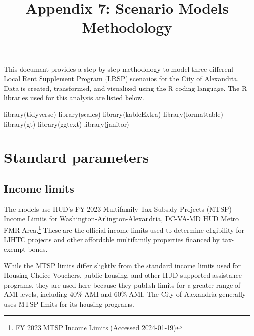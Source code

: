 \documentclass[
  10pt,
  letterpaper,
  DIV=11,
  numbers=noendperiod]{scrartcl}
\title{Appendix 7: Scenario Models Methodology}
\author{}
\date{}
\newenvironment{Shaded}{\begin{snugshade}}{\end{snugshade}}
\newcommand{\FunctionTok}[1]{\textcolor[rgb]{0.28,0.35,0.67}{#1}}
\newcommand{\NormalTok}[1]{\textcolor[rgb]{0.00,0.23,0.31}{#1}}
\begin{document}
\maketitle

\vspace{-1.5cm}

This document provides a step-by-step methodology to model three
different Local Rent Supplement Program (LRSP) scenarios for the City of
Alexandria. Data is created, transformed, and visualized using the R
coding language. The R libraries used for this analysis are listed
below.

\begin{Shaded}
\begin{Highlighting}[]
\FunctionTok{library}\NormalTok{(tidyverse)}
\FunctionTok{library}\NormalTok{(scales)}
\FunctionTok{library}\NormalTok{(kableExtra)}
\FunctionTok{library}\NormalTok{(formattable)}
\FunctionTok{library}\NormalTok{(gt)}
\FunctionTok{library}\NormalTok{(ggtext)}
\FunctionTok{library}\NormalTok{(janitor)}
\end{Highlighting}
\end{Shaded}

\section{Standard parameters}\label{standard-parameters}

\subsection{Income limits}\label{income-limits}

The models use HUD's FY 2023 Multifamily Tax Subsidy Projects (MTSP)
Income Limits for Washington-Arlington-Alexandria, DC-VA-MD HUD Metro
FMR Area.\footnote{\href{https://www.huduser.gov/portal/datasets/il/il2023/2023sum_mtsp.odn?inputname=METRO47900M47900*Washington-Arlington-Alexandria\%2C+DC-VA-MD+HUD+Metro+FMR+Area&area_choice=hmfa&year=2023\#top}{FY
  2023 MTSP Income Limits} (Accessed 2024-01-19)} These are the official
income limits used to determine eligibility for LIHTC projects and other
affordable multifamily properties financed by tax-exempt bonds.

While the MTSP limits differ slightly from the standard income limits
used for Housing Choice Vouchers, public housing, and other
HUD-supported assistance programs, they are used here because they
publish limits for a greater range of AMI levels, including 40\% AMI and
60\% AMI. The City of Alexandria generally uses MTSP limits for its
housing programs.
\end{document}
